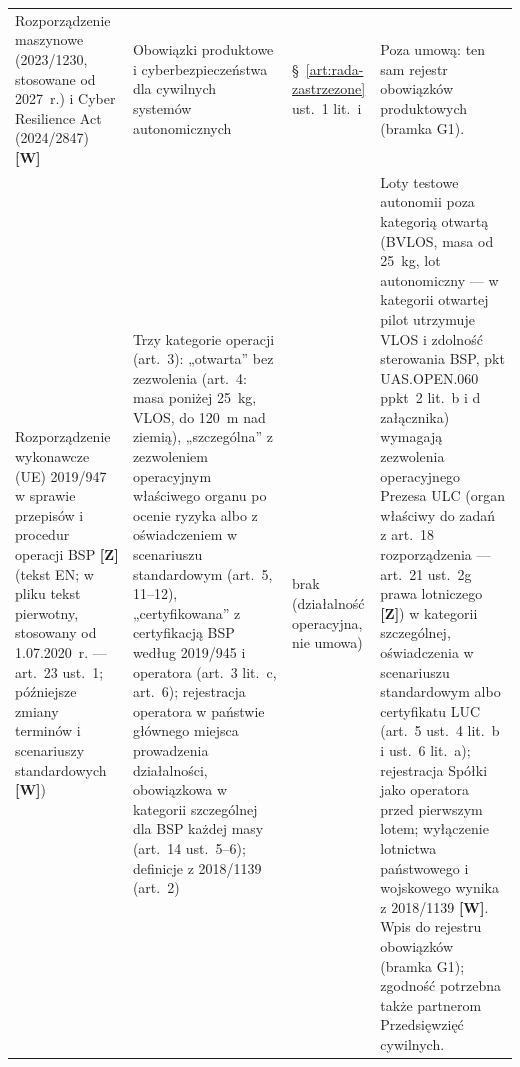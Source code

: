 \documentclass[12pt,a4paper]{report}
\newcommand{\Wiar}[1]{\textbf{[#1]}}
\begin{document}
\begin{longtable}{@{}p{3.1cm} p{3.7cm} p{3.3cm} p{4.4cm}@{}}
Rozporządzenie maszynowe (2023/1230, stosowane od 2027~r.) i Cyber Resilience Act (2024/2847) \Wiar{W} & Obowiązki produktowe i cyberbezpieczeństwa dla cywilnych systemów autonomicznych & §~\ref{art:rada-zastrzezone} ust.~1 lit.~i & Poza umową: ten sam rejestr obowiązków produktowych (bramka G1). \\
Rozporządzenie wykonawcze (UE) 2019/947 w sprawie przepisów i procedur operacji BSP \Wiar{Z} (tekst EN; w pliku tekst pierwotny, stosowany od 1.07.2020~r. --- art.~23 ust.~1; późniejsze zmiany terminów i scenariuszy standardowych \Wiar{W}) & Trzy kategorie operacji (art.~3): „otwarta” bez zezwolenia (art.~4: masa poniżej 25~kg, VLOS, do 120~m nad ziemią), „szczególna” z zezwoleniem operacyjnym właściwego organu po ocenie ryzyka albo z oświadczeniem w scenariuszu standardowym (art.~5, 11--12), „certyfikowana” z certyfikacją BSP według 2019/945 i operatora (art.~3 lit.~c, art.~6); rejestracja operatora w państwie głównego miejsca prowadzenia działalności, obowiązkowa w kategorii szczególnej dla BSP każdej masy (art.~14 ust.~5--6); definicje z 2018/1139 (art.~2) & brak (działalność operacyjna, nie umowa) & Loty testowe autonomii poza kategorią otwartą (BVLOS, masa od 25~kg, lot autonomiczny --- w kategorii otwartej pilot utrzymuje VLOS i zdolność sterowania BSP, pkt UAS.OPEN.060 ppkt~2 lit.~b i d załącznika) wymagają zezwolenia operacyjnego Prezesa ULC (organ właściwy do zadań z art.~18 rozporządzenia --- art.~21 ust.~2g prawa lotniczego \Wiar{Z}) w kategorii szczególnej, oświadczenia w scenariuszu standardowym albo certyfikatu LUC (art.~5 ust.~4 lit.~b i ust.~6 lit.~a); rejestracja Spółki jako operatora przed pierwszym lotem; wyłączenie lotnictwa państwowego i wojskowego wynika z 2018/1139 \Wiar{W}. Wpis do rejestru obowiązków (bramka G1); zgodność potrzebna także partnerom Przedsięwzięć cywilnych. \\

\end{longtable}
\end{document}
